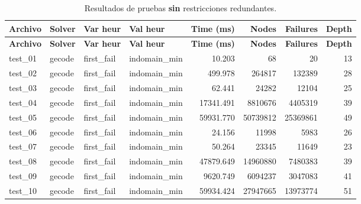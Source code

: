 \begin{longtable}{l l l l r r r r}
    \caption{Resultados de pruebas \textbf{sin} restricciones redundantes.}\label{tab:pruebas-jobshop_mantenimiento-off}                                  \\
    \toprule
    \textbf{Archivo} & \textbf{Solver} & \textbf{Var heur} & \textbf{Val heur} & \textbf{Time (ms)} & \textbf{Nodes} & \textbf{Failures} & \textbf{Depth} \\
    \midrule
    \endfirsthead
    \toprule
    \textbf{Archivo} & \textbf{Solver} & \textbf{Var heur} & \textbf{Val heur} & \textbf{Time (ms)} & \textbf{Nodes} & \textbf{Failures} & \textbf{Depth} \\
    \midrule
    \endhead
    \bottomrule
    \endlastfoot

    test\_01         & gecode          & first\_fail       & indomain\_min     & 10.203             & 68             & 20                & 13             \\
    test\_02         & gecode          & first\_fail       & indomain\_min     & 499.978            & 264817         & 132389            & 28             \\
    test\_03         & gecode          & first\_fail       & indomain\_min     & 62.441             & 24282          & 12104             & 25             \\
    test\_04         & gecode          & first\_fail       & indomain\_min     & 17341.491          & 8810676        & 4405319           & 39             \\
    test\_05         & gecode          & first\_fail       & indomain\_min     & 59931.770          & 50739812       & 25369861          & 49             \\
    test\_06         & gecode          & first\_fail       & indomain\_min     & 24.156             & 11998          & 5983              & 26             \\
    test\_07         & gecode          & first\_fail       & indomain\_min     & 50.264             & 23345          & 11649             & 23             \\
    test\_08         & gecode          & first\_fail       & indomain\_min     & 47879.649          & 14960880       & 7480383           & 39             \\
    test\_09         & gecode          & first\_fail       & indomain\_min     & 9620.749           & 6094237        & 3047083           & 41             \\
    test\_10         & gecode          & first\_fail       & indomain\_min     & 59934.424          & 27947665       & 13973774          & 51             \\

\end{longtable}
